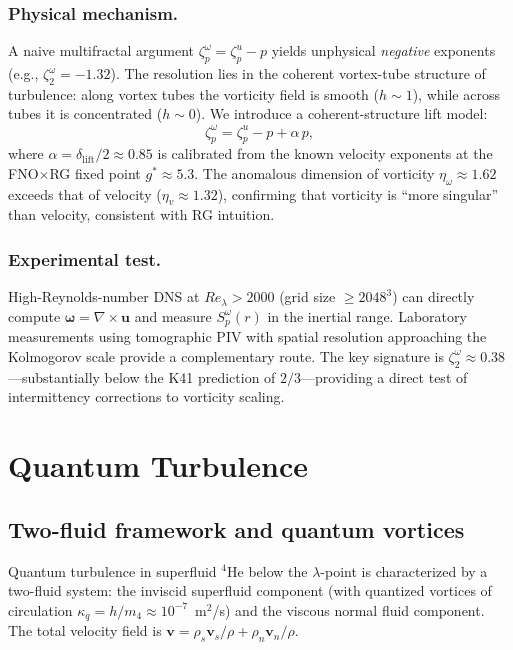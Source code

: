 \subsubsection*{Physical mechanism.}
A naive multifractal argument $\zeta_p^\omega=\zeta_p^u-p$ yields unphysical \emph{negative} exponents (e.g., $\zeta_2^\omega=-1.32$). The resolution lies in the coherent vortex-tube structure of turbulence: along vortex tubes the vorticity field is smooth ($h\sim 1$), while across tubes it is concentrated ($h\sim 0$). We introduce a coherent-structure lift model:
\begin{equation}
\zeta_p^\omega = \zeta_p^u - p + \alpha\, p,
\end{equation}
where $\alpha=\delta_{\mathrm{lift}}/2\approx 0.85$ is calibrated from the known velocity exponents at the FNO$\times$RG fixed point $g^*\approx 5.3$. The anomalous dimension of vorticity $\eta_\omega\approx 1.62$ exceeds that of velocity ($\eta_v\approx 1.32$), confirming that vorticity is ``more singular'' than velocity, consistent with RG intuition.

\subsubsection*{Experimental test.}
High-Reynolds-number DNS at $Re_\lambda>2000$ (grid size $\geq 2048^3$) can directly compute $\boldsymbol{\omega}=\nabla\times\mathbf{u}$ and measure $S_p^\omega(r)$ in the inertial range. Laboratory measurements using tomographic PIV with spatial resolution approaching the Kolmogorov scale provide a complementary route. The key signature is $\zeta_2^\omega\approx 0.38$---substantially below the K41 prediction of $2/3$---providing a direct test of intermittency corrections to vorticity scaling.

\section{Quantum Turbulence\label{sec:quantum}}

\subsection{Two-fluid framework and quantum vortices}

Quantum turbulence in superfluid $^4$He below the $\lambda$-point is characterized by a two-fluid system: the inviscid superfluid component (with quantized vortices of circulation $\kappa_q = h/m_4 \approx 10^{-7}$~m$^2$/s) and the viscous normal fluid component. The total velocity field is $\mathbf{v} = \rho_s\mathbf{v}_s/\rho + \rho_n\mathbf{v}_n/\rho$.


